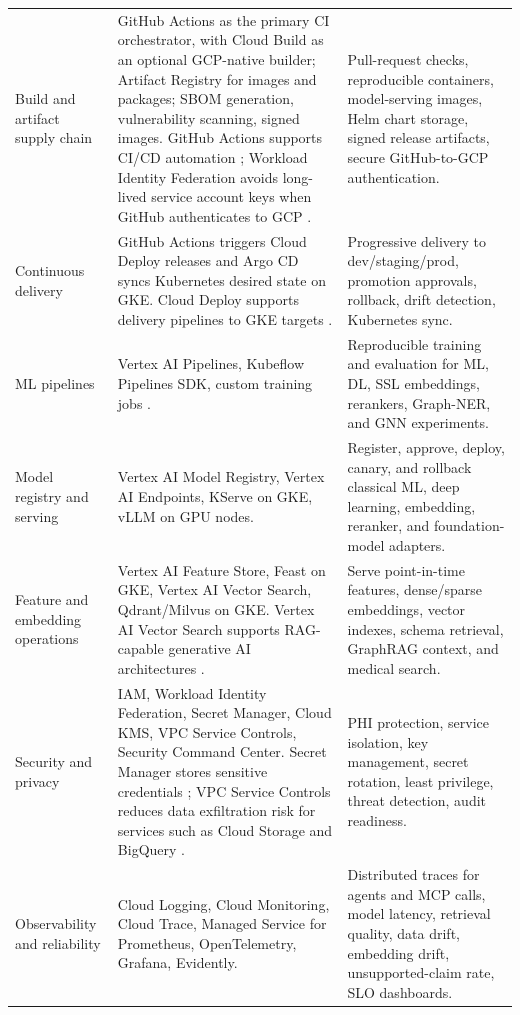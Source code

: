 \begin{longtable}{p{}p{}p{}}
Build and artifact supply chain & GitHub Actions as the primary CI orchestrator, with Cloud Build as an optional GCP-native builder; Artifact Registry for images and packages; SBOM generation, vulnerability scanning, signed images. GitHub Actions supports CI/CD automation \cite{githubActions}; Workload Identity Federation avoids long-lived service account keys when GitHub authenticates to GCP \cite{workloadIdentityFederation,githubOIDCGCP}. & Pull-request checks, reproducible containers, model-serving images, Helm chart storage, signed release artifacts, secure GitHub-to-GCP authentication. \\
\addlinespace
Continuous delivery & GitHub Actions triggers Cloud Deploy releases and Argo CD syncs Kubernetes desired state on GKE. Cloud Deploy supports delivery pipelines to GKE targets \cite{cloudDeployGKE}. & Progressive delivery to dev/staging/prod, promotion approvals, rollback, drift detection, Kubernetes sync. \\
\addlinespace
ML pipelines & Vertex AI Pipelines, Kubeflow Pipelines SDK, custom training jobs \cite{vertexPipelines}. & Reproducible training and evaluation for ML, DL, SSL embeddings, rerankers, Graph-NER, and GNN experiments. \\
\addlinespace
Model registry and serving & Vertex AI Model Registry, Vertex AI Endpoints, KServe on GKE, vLLM on GPU nodes. & Register, approve, deploy, canary, and rollback classical ML, deep learning, embedding, reranker, and foundation-model adapters. \\
\addlinespace
Feature and embedding operations & Vertex AI Feature Store, Feast on GKE, Vertex AI Vector Search, Qdrant/Milvus on GKE. Vertex AI Vector Search supports RAG-capable generative AI architectures \cite{vertexVectorSearch}. & Serve point-in-time features, dense/sparse embeddings, vector indexes, schema retrieval, GraphRAG context, and medical search. \\
\addlinespace
Security and privacy & IAM, Workload Identity Federation, Secret Manager, Cloud KMS, VPC Service Controls, Security Command Center. Secret Manager stores sensitive credentials \cite{secretManager}; VPC Service Controls reduces data exfiltration risk for services such as Cloud Storage and BigQuery \cite{vpcServiceControls}. & PHI protection, service isolation, key management, secret rotation, least privilege, threat detection, audit readiness. \\
\addlinespace
Observability and reliability & Cloud Logging, Cloud Monitoring, Cloud Trace, Managed Service for Prometheus, OpenTelemetry, Grafana, Evidently. & Distributed traces for agents and MCP calls, model latency, retrieval quality, data drift, embedding drift, unsupported-claim rate, SLO dashboards. \\
\bottomrule
\end{longtable}

